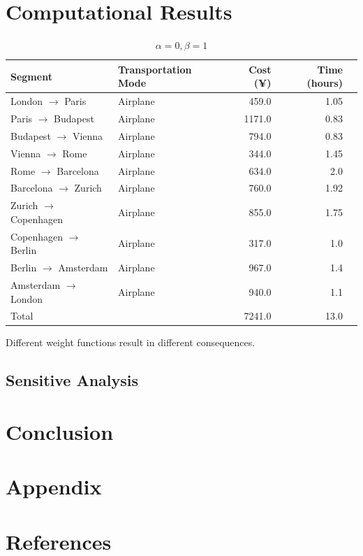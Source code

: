 \documentclass{article}
\begin{document}
\section{Computational Results}
\begin{table}[!ht]
  \centering
  \begin{tabular}{llrrr}
    \toprule
    Segment                          & Transportation Mode & Cost (¥) & Time (hours) \\
    \midrule
    London $\rightarrow$  Paris      & Airplane            & 459.0    & 1.05         \\
    Paris $\rightarrow$  Budapest    & Airplane            & 1171.0   & 0.83         \\
    Budapest $\rightarrow$  Vienna   & Airplane            & 794.0    & 0.83         \\
    Vienna $\rightarrow$  Rome       & Airplane            & 344.0    & 1.45         \\
    Rome $\rightarrow$  Barcelona    & Airplane            & 634.0    & 2.0          \\
    Barcelona $\rightarrow$  Zurich  & Airplane            & 760.0    & 1.92         \\
    Zurich $\rightarrow$  Copenhagen & Airplane            & 855.0    & 1.75         \\
    Copenhagen $\rightarrow$  Berlin & Airplane            & 317.0    & 1.0          \\
    Berlin $\rightarrow$  Amsterdam  & Airplane            & 967.0    & 1.4          \\
    Amsterdam $\rightarrow$  London  & Airplane            & 940.0    & 1.1          \\
    \midrule
    Total                            &                     & 7241.0   & 13.0         \\
    \bottomrule
  \end{tabular}
  \caption{$\alpha=0, \beta=1$}%
  \label{tab:city-travel}
\end{table}
Different weight functions result in different
consequences\cite{lamport1994latex}.
\subsection*{Sensitive Analysis}
\section{Conclusion}
\section{Appendix}
\section{References}
\printbibliography[heading=none]
\end{document}
